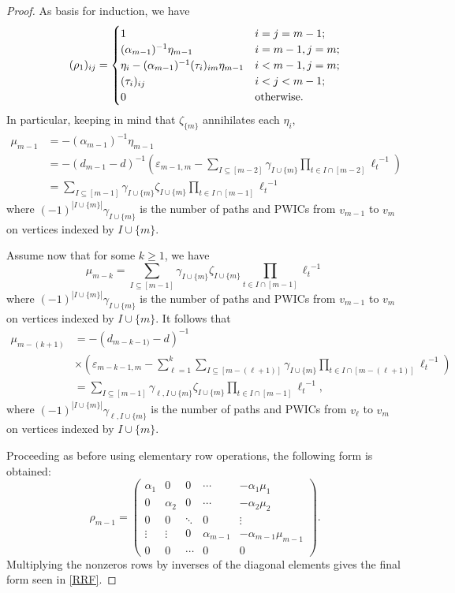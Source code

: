 \documentclass{article}
\theoremstyle{definition}
\numberwithin{equation}{section}
\begin{document}
\begin{proof}
As basis for induction, we have \begin{equation}
(\rho_1)_{ij}=\begin{cases}
1&i=j=m-1;\\
(\alpha_{m-1})^{-1}\eta_{m-1}& i=m-1, j=m;\\
\eta_i-(\alpha_{m-1})^{-1}(\tau_i)_{im}\eta_{m-1}& i<m-1, j=m;\\
(\tau_i)_{ij}& i<j<m-1; \\
0&\text{\rm otherwise.}
\end{cases}
\end{equation}
In particular, keeping in mind that $\zeta_{\{m\}}$ annihilates each $\eta_i$, 
\begin{align*}
\mu_{m-1}&=-(\alpha_{m-1})^{-1}\eta_{m-1}\\
&=-(d_{m-1}-d)^{-1}\left(\varepsilon_{m-1,m}-\sum_{I\subseteq[m-2]}\gamma_{I\cup\{m\}}\prod_{t\in I\cap[m-2]}{\ell_t}^{-1}\right)\\
&=\sum_{I\subseteq[m-1]}\gamma_{I\cup\{m\}}\zeta_{I\cup\{m\}}\prod_{t\in I\cap[m-1]}{\ell_t}^{-1}
\end{align*}
where $(-1)^{|I\cup\{m\}|}\gamma_{I\cup\{m\}}$ is the number of paths and PWICs from $v_{m-1}$ to $v_m$ on vertices indexed by $I\cup\{m\}$.   

Assume now that for some $k\ge1$, we have \begin{equation}\label{IH}
\mu_{m-k}=\sum_{I\subseteq[m-1]}\gamma_{I\cup\{m\}}\zeta_{I\cup\{m\}}\prod_{t\in I\cap[m-1]}{\ell_t}^{-1}
\end{equation}
where $(-1)^{|I\cup\{m\}|}\gamma_{I\cup\{m\}}$ is the number of paths and PWICs from $v_{m-1}$ to $v_m$ on vertices indexed by $I\cup\{m\}$.  It follows that 
\begin{align*}
\mu_{m-(k+1)}&=-(d_{m-k-1)}-d)^{-1}\\
&\times\left(\varepsilon_{m-k-1,m}-\sum_{\ell=1}^k
\sum_{I\subseteq[m-(\ell+1)]}\gamma_{I\cup\{m\}}\prod_{t\in I\cap[m-(\ell+1)]}{\ell_t}^{-1}\right)\\
&=\sum_{I\subseteq[m-1]}\gamma_{\ell,I\cup\{m\}}\zeta_{I\cup\{m\}}\prod_{t\in I\cap[m-1]}{\ell_t}^{-1},
\end{align*}
where $(-1)^{|I\cup\{m\}|}\gamma_{\ell, I\cup\{m\}}$ is the number of paths and PWICs from $v_{\ell}$ to $v_m$ on vertices indexed by $I\cup\{m\}$.  

 
Proceeding as before using elementary row operations, the following form is obtained:  
\begin{equation}
\rho_{m-1}=\left(\begin{matrix}
\alpha_1&0&0&\cdots&-\alpha_1\mu_1\\
0&\alpha_2&0&\cdots&-\alpha_2\mu_2\\
0&0&\ddots&0&\vdots\\
\vdots&\vdots&0&\alpha_{m-1}&-\alpha_{m-1}\mu_{m-1}\\
0&0&\cdots&0&0
\end{matrix}\right).  
\end{equation}
Multiplying the nonzeros rows by inverses of the diagonal elements gives the final form seen in \eqref{RRF}.  


\end{proof}
\end{document}
